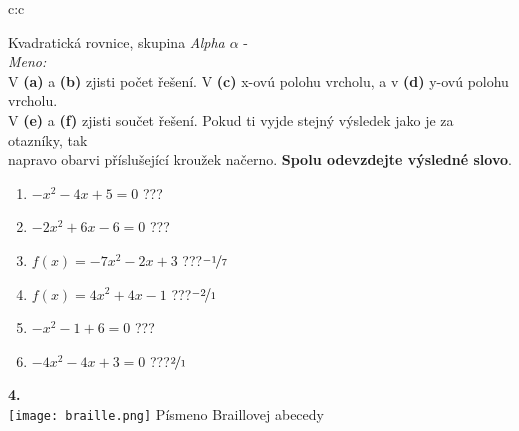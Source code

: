 \documentclass[10pt]{report}
\begin{document}
\begin{tabular}{c:c}
\begin{minipage}[c][99mm][t]{0.49\linewidth}
\begin{center}
{\huge Kvadratická rovnice, skupina \textit{Alpha $\alpha$} -}\\[4.5mm]
\textit{Meno:}\phantom{xxxxxxxxxxxxxxxxxxxxxxxxxxxxxxxxxxxxxxxxxxxxxxxxxxxxxxxxxxxxxxxxx}\\[3.5mm]
V \textbf{(a)} a \textbf{(b)} zjisti počet řešení. V \textbf{(c)} x-ovú polohu vrcholu, a v \textbf{(d)} y-ovú polohu vrcholu.\\V \textbf{(e)} a \textbf{(f)} zjisti součet řešení. Pokud ti vyjde stejný výsledek jako je za otazníky, tak\\napravo obarvi příslušející kroužek načerno. \textbf{Spolu odevzdejte výsledné slovo}.\\[3mm]
\begin{minipage}{0.77\linewidth}
\begin{center}
\begin{varwidth}{\textwidth}
\begin{enumerate}
\large
\item $-x^2-4x+5=0$\quad \dotfill\; ???\;\dotfill {}
\item $-2x^2+6x-6=0$\quad \dotfill\; ???\;\dotfill {}
\item $f(x)=-7x^2-2x+3$\quad \dotfill\; ???\;\dotfill \quad $\nicefrac{-1}{7}$
\item $f(x)=4x^2+4x-1$\quad \dotfill\; ???\;\dotfill \quad $\nicefrac{-2}{1}$
\item $-x^2-1+6=0$\quad \dotfill\; ???\;\dotfill {}
\item $-4x^2-4x+3=0$\quad \dotfill\; ???\;\dotfill \quad $\nicefrac{2}{1}$
\end{enumerate}
\end{varwidth}
\end{center}
\end{minipage}
\begin{minipage}{0.20\linewidth}
\begin{center}
{\Huge\bfseries 4.} \\[2mm]
\texttt{[image: braille.png]}
{\small Písmeno Braillovej abecedy}
\end{center}
\end{minipage}
\end{center}
\end{minipage}

\end{tabular}
\end{document}

